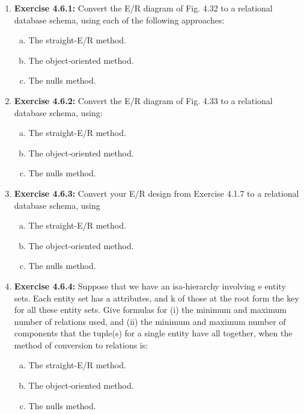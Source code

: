 \documentclass[12pt]{article}
\begin{document}
\begin{enumerate}[1.]
    \item \textbf{Exercise 4.6.1:} Convert the E/R diagram of Fig. 4.32 to a relational database
    schema, using each of the following approaches:

    \begin{enumerate}[a)]
        \item The straight-E/R method.
        \item The object-oriented method.
        \item The nulls method.
    \end{enumerate}

    \item \textbf{Exercise 4.6.2:} Convert the E/R diagram of Fig. 4.33 to a relational database
    schema, using:

    \bigskip

    \begin{enumerate}[a)]
        \item The straight-E/R method.
        \item The object-oriented method.
        \item The nulls method.
    \end{enumerate}

    \item \textbf{Exercise 4.6.3:} Convert your E/R design from Exercise 4.1.7 to a relational
    database schema, using

    \bigskip

    \begin{enumerate}[a)]
        \item The straight-E/R method.
        \item The object-oriented method.
        \item The nulls method.
    \end{enumerate}

    \item \textbf{Exercise 4.6.4:} Suppose that we have an isa-hierarchy involving e entity sets.
    Each entity set has a attributes, and k of those at the root form the key for all
    these entity sets. Give formulas for (i) the minimum and maximum number of
    relations used, and (ii) the minimum and maximum number of components that
    the tuple(s) for a single entity have all together, when the method of conversion
    to relations is:

    \bigskip

    \begin{enumerate}[a)]
        \item The straight-E/R method.
        \item The object-oriented method.
        \item The nulls method.
    \end{enumerate}



\end{enumerate}
\end{document}
